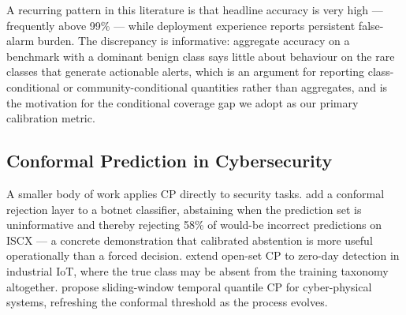 A recurring pattern in this literature is that headline accuracy is very high —
frequently above 99\% — while deployment experience reports persistent
false-alarm burden. The discrepancy is informative: aggregate accuracy on a
benchmark with a dominant benign class says little about behaviour on the rare
classes that generate actionable alerts, which is an argument for reporting
class-conditional or community-conditional quantities rather than aggregates,
and is the motivation for the conditional coverage gap we adopt as our primary
calibration metric.


\subsection{Conformal Prediction in Cybersecurity}

A smaller body of work applies CP directly to security tasks.
\citet{botnet_cp} add a conformal rejection layer to a botnet classifier,
abstaining when the prediction set is uninformative and thereby rejecting 58\%
of would-be incorrect predictions on ISCX — a concrete demonstration that
calibrated abstention is more useful operationally than a forced decision.
\citet{damba26} extend open-set CP to zero-day detection in industrial IoT,
where the true class may be absent from the training taxonomy altogether.
\citet{cp_cps26} propose sliding-window temporal quantile CP for cyber-physical
systems, refreshing the conformal threshold as the process evolves.

